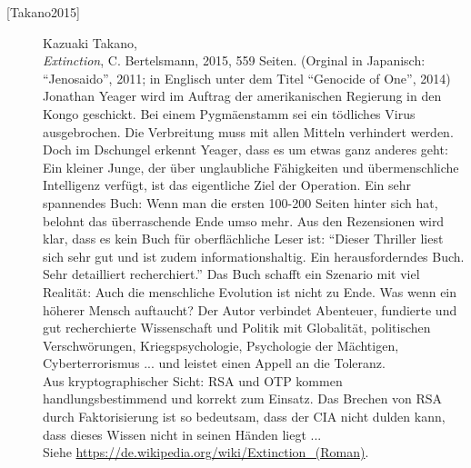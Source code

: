\begin{description}
\item[\textrm{[Takano2015]}] 
    Kazuaki Takano, \\
    {\em Extinction}, C. Bertelsmann, 2015, 559 Seiten. (Orginal in Japanisch: "`Jenosaido"', 2011;
    in Englisch unter dem Titel "`Genocide of One"', 2014)\\
    Jonathan Yeager wird im Auftrag der amerikanischen Regierung in den Kongo geschickt.
    Bei einem Pygmäenstamm sei ein tödliches Virus ausgebrochen. Die Verbreitung muss
    mit allen Mitteln verhindert werden. Doch im Dschungel erkennt Yeager, dass es um
    etwas ganz anderes geht: Ein kleiner Junge, der über unglaubliche Fähigkeiten und
    übermenschliche Intelligenz verfügt, ist das eigentliche Ziel der Operation.
    Ein sehr spannendes Buch: Wenn man die ersten 100-200 Seiten hinter sich hat,
    belohnt das überraschende Ende umso mehr. Aus den Rezensionen wird klar, dass es
    kein Buch für oberflächliche Leser ist: "`Dieser Thriller liest sich sehr gut und
    ist zudem informationshaltig. Ein herausforderndes Buch. Sehr detailliert recherchiert."'
    Das Buch schafft ein Szenario mit viel Realität: Auch die menschliche Evolution ist
    nicht zu Ende. Was wenn ein höherer Mensch auftaucht? Der Autor verbindet Abenteuer,
    fundierte und gut recherchierte Wissenschaft und Politik mit Globalität, politischen
    Verschwörungen, Kriegspsychologie, Psychologie der Mächtigen, Cyberterrorismus ...
    und leistet einen Appell an die Toleranz.\\
    Aus kryptographischer Sicht: RSA und OTP kommen handlungsbestimmend und korrekt zum Einsatz.
    Das Brechen von RSA durch Faktorisierung ist so bedeutsam, dass der CIA nicht
    dulden kann, dass dieses Wissen nicht in seinen Händen liegt ...\\
    Siehe \url{https://de.wikipedia.org/wiki/Extinction_(Roman)}.\\





\end{description}
